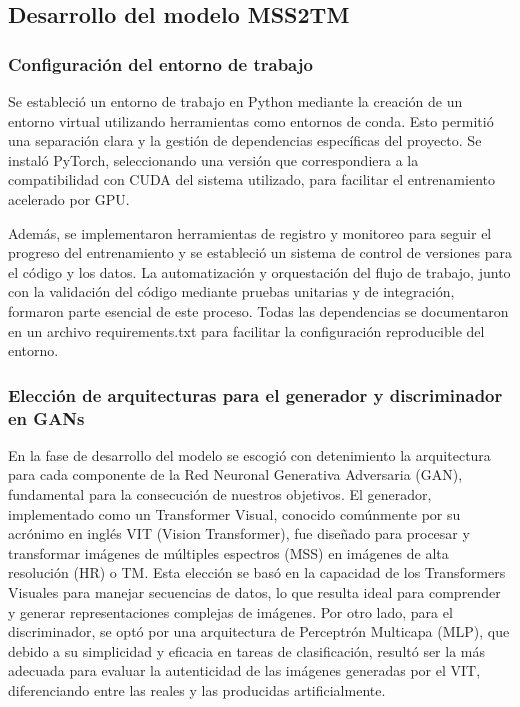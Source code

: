         \subsection{Desarrollo del modelo MSS2TM}


        
            \subsubsection{Configuración del entorno de trabajo}
                Se estableció un entorno de trabajo en Python mediante la creación de un entorno virtual utilizando herramientas como entornos de conda. Esto permitió una separación clara y la gestión de dependencias específicas del proyecto. Se instaló PyTorch, seleccionando una versión que correspondiera a la compatibilidad con CUDA del sistema utilizado, para facilitar el entrenamiento acelerado por GPU.
            
                Además, se implementaron herramientas de registro y monitoreo para seguir el progreso del entrenamiento y se estableció un sistema de control de versiones para el código y los datos. La automatización y orquestación del flujo de trabajo, junto con la validación del código mediante pruebas unitarias y de integración, formaron parte esencial de este proceso. Todas las dependencias se documentaron en un archivo requirements.txt para facilitar la configuración reproducible del entorno.


            \subsubsection{Elección de arquitecturas para el generador y discriminador en GANs}
                En la fase de desarrollo del modelo se escogió con detenimiento la arquitectura para cada componente de la Red Neuronal Generativa Adversaria (GAN), fundamental para la consecución de nuestros objetivos. El generador, implementado como un Transformer Visual, conocido comúnmente por su acrónimo en inglés VIT (Vision Transformer), fue diseñado para procesar y transformar imágenes de múltiples espectros (MSS) en imágenes de alta resolución (HR) o TM. Esta elección se basó en la capacidad de los Transformers Visuales para manejar secuencias de datos, lo que resulta ideal para comprender y generar representaciones complejas de imágenes. Por otro lado, para el discriminador, se optó por una arquitectura de Perceptrón Multicapa (MLP), que debido a su simplicidad y eficacia en tareas de clasificación, resultó ser la más adecuada para evaluar la autenticidad de las imágenes generadas por el VIT, diferenciando entre las reales y las producidas artificialmente. 
            
